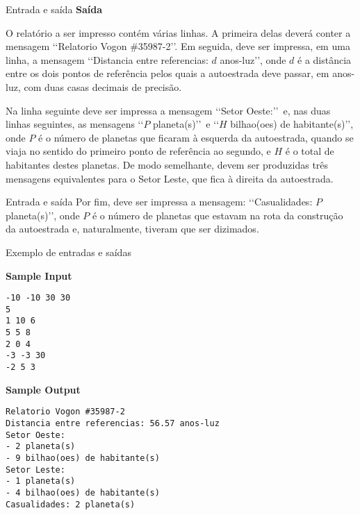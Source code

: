 \begin{frame}[fragile]{Entrada e saída}
\textbf{Saída}

O relatório a ser impresso contém várias linhas. A primeira delas deverá conter a mensagem 
\lq\lq Relatorio Vogon \#35987-2\rq\rq. Em seguida, deve ser impressa, em uma linha, a mensagem \lq\lq Distancia entre referencias: $d$ anos-luz\rq\rq, onde $d$ é a distância entre os dois pontos de referência pelos quais a autoestrada deve passar, em anos-luz, com duas casas decimais de precisão.

Na linha seguinte deve ser impressa a mensagem \lq\lq Setor Oeste:\rq\rq\ e, nas duas linhas seguintes, as mensagens \lq\lq $P$ planeta(s)\rq\rq\ e \lq\lq $H$ bilhao(oes) de habitante(s)\rq\rq, onde $P$ é o número de planetas que ficaram à esquerda da autoestrada, quando se viaja no sentido do primeiro ponto de referência ao segundo, e $H$ é o total de habitantes destes planetas. De modo semelhante, devem ser produzidas três mensagens equivalentes para o Setor Leste, que fica à direita da autoestrada.
\end{frame}

\begin{frame}[fragile]{Entrada e saída}
Por fim, deve ser impressa a mensagem: \lq\lq Casualidades: $P$ planeta(s)\rq\rq, onde $P$ é o número de planetas que estavam na rota da construção da autoestrada e, naturalmente, tiveram que ser dizimados.

\end{frame}

\begin{frame}[fragile]{Exemplo de entradas e saídas}

\begin{minipage}[t]{0.3\textwidth}
\textbf{Sample Input}
\begin{verbatim}
-10 -10 30 30
5
1 10 6
5 5 8
2 0 4
-3 -3 30
-2 5 3
\end{verbatim}
\end{minipage}
\begin{minipage}[t]{0.65\textwidth}
\textbf{Sample Output}
\begin{verbatim}
Relatorio Vogon #35987-2
Distancia entre referencias: 56.57 anos-luz
Setor Oeste:
- 2 planeta(s)
- 9 bilhao(oes) de habitante(s)
Setor Leste:
- 1 planeta(s)
- 4 bilhao(oes) de habitante(s)
Casualidades: 2 planeta(s)
\end{verbatim}
\end{minipage}
\end{frame}

